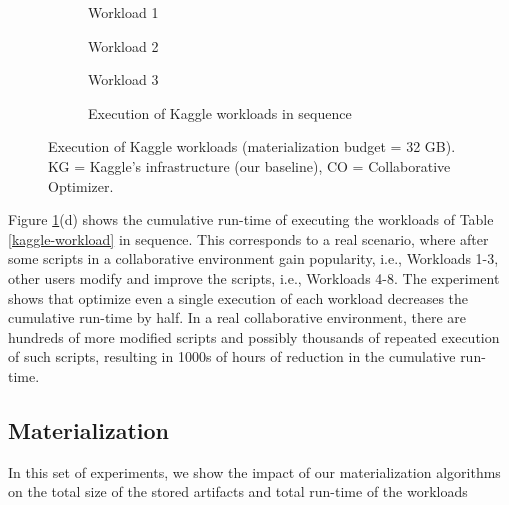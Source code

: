 \begin{figure}
\begin{subfigure}[b]{0.33\linewidth}
\centering
 \resizebox{\columnwidth}{!}{%
%
}
\caption{Workload 1}
\end{subfigure}%
\begin{subfigure}[b]{0.33\linewidth}
\centering
 \resizebox{\columnwidth}{!}{%
%
}
\caption{Workload 2}
\end{subfigure}%
\begin{subfigure}[b]{0.33\linewidth}
\centering
 \resizebox{\columnwidth}{!}{%
%
}
\caption{Workload 3}
\end{subfigure}
\begin{subfigure}[b]{\linewidth}
\centering
 \resizebox{\columnwidth}{!}{%
%
}
\caption{Execution of Kaggle workloads in sequence}
\end{subfigure}
\caption{Execution of Kaggle workloads (materialization budget = 32 GB). KG = Kaggle's infrastructure (our baseline), CO = Collaborative Optimizer.}
\label{exp-reuse-kaggle-same-workload}
\end{figure}

Figure \ref{exp-reuse-kaggle-same-workload}(d) shows the cumulative run-time of executing the workloads of Table \ref{kaggle-workload} in sequence.
This corresponds to a real scenario, where after some scripts in a collaborative environment gain popularity, i.e., Workloads 1-3, other users modify and improve the scripts, i.e., Workloads 4-8.
The experiment shows that optimize even a single execution of each workload decreases the cumulative run-time by half.
In a real collaborative environment, there are hundreds of more modified scripts and possibly thousands of repeated execution of such scripts, resulting in 1000s of hours of reduction in the cumulative run-time.

\subsection{Materialization}
In this set of experiments, we show the impact of our materialization algorithms on the total size of the stored artifacts and total run-time of the workloads


